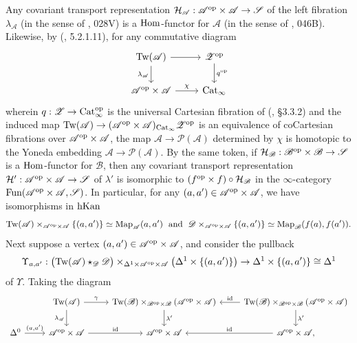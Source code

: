 \documentclass{tac}
\newcommand{\s}[1]{\mathscr{#1}}
\renewcommand{\c}[1]{\mathcal{#1}}
\newcommand{\tx}[1]{\textnormal{#1}}
\begin{document}
\begin{rmk}
Any covariant transport representation $\c{H}_\s{A} : \s{A}^\tx{op} \times \s{A}\to\s{S}$ of the left fibration $\lambda_{\s{A}}$  (in the sense of \cite{kerodon}, 028V) is a $\tx{Hom}$-functor for $\s{A}$ (in the sense of \cite{kerodon}, 046B).  Likewise, by (\cite{ha}, 5.2.1.11), for any commutative diagram
\[ \begin{tikzcd}
\tx{Tw}(\s{A}) \arrow[]{r} \arrow[]{d}[swap]{\lambda_\s{A}} & \s{Z}^\tx{op} \arrow[]{d}{q^\tx{op}} \\
 \s{A}^\tx{op} \times \s{A} \arrow[]{r}{\chi} & \tx{Cat}_\infty
\end{tikzcd}\]
wherein $q : \s{Z} \to \tx{Cat}_\infty^\tx{op}$ is the universal Cartesian fibration of (\cite{htt}, \S 3.3.2) and the induced map $\tx{Tw}(\s{A}) \to  (\s{A}^\tx{op} \times \s{A} )_{\tx{Cat}_\infty} \s{Z}^\tx{op}$ is an equivalence of coCartesian fibrations over $\s{A}^\tx{op} \times \s{A}$, the map $\s{A} \to \s{P}(\s{A})$ determined by $\chi$ is homotopic to the Yoneda embedding $\s{A} \to \s{P}(\s{A})$.  By the same token, if $\c{H}_{\s{B}} : \s{B}^\tx{op} \times \s{B} \to \s{S}$ is a $\tx{Hom}$-functor for $\s{B}$, then any covariant transport representation $\c{H}' : \s{A}^\tx{op} \times \s{A} \to \s{S}$ of $\lambda'$ is isomorphic to $(f^\tx{op} \times f)\circ \c{H}_{\s{B}}$ in the $\infty$-category $\tx{Fun}(\s{A}^\tx{op} \times \s{A}, \s{S})$.  In particular, for any $(a,a') \in \s{A}^\tx{op} \times \s{A}$, we have isomorphisms in $\tx{h}\tx{Kan}$
\[ \tx{Tw}(\s{A}) \times_{\s{A}^\tx{op} \times \s{A}} \{ (a,a') \} \simeq \tx{Map}_{\s{A}} (a,a') \tx{\; and \;} \s{D} \times_{\s{A}^\tx{op} \times \s{A}} \{ (a,a') \} \simeq \tx{Map}_{\s{B}} (f(a),f(a')) . \]
Next suppose a vertex $(a,a') \in \s{A}^\tx{op} \times\s{A}$, and consider the pullback 
\[ \Upsilon_{a,a'} : \big( \tx{Tw}(\s{A}) \star_{\s{D}} \s{D} \big) \times_{\Delta^{1} \times \s{A}^\tx{op}\times \s{A} } \big( \Delta^{1} \times \{ (a,a') \} \big) \to \Delta^1 \times \{ (a,a') \} \cong \Delta^1 \]
of $\Upsilon$.  Taking the diagram
\[\begin{tikzcd}
& \tx{Tw}(\s{A}) \arrow[]{r}{\gamma} \arrow[]{d}[swap]{\lambda_{\s{A}}} & \tx{Tw}(\s{B}) \times_{\s{B}^\tx{op} \times \s{B}} (\s{A}^\tx{op}\times \s{A}) \arrow[]{d}{\lambda'} & \tx{Tw}(\s{B}) \times_{\s{B}^\tx{op} \times \s{B}} (\s{A}^\tx{op}\times \s{A}) \arrow[]{d}{\lambda'} \arrow[]{l}[swap]{\tx{id}}  \\
\Delta^0 \arrow[]{r}{(a,a')} & \s{A}^\tx{op}\times \s{A} \arrow[]{r}{\tx{id}} & \s{A}^\tx{op}\times \s{A} &  \s{A}^\tx{op}\times \s{A} \arrow[]{l}[swap]{\tx{id}},

\end{tikzcd}\]
\end{rmk}
\end{document}
